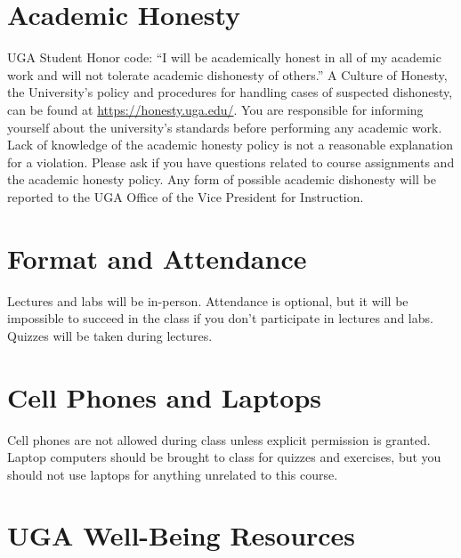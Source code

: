 \documentclass[12pt]{article}
\begin{document}
\newpage

\vspace{-2mm}
\section*{\normalsize Academic Honesty}
\vspace{-4mm}

UGA Student Honor code: ``I will be academically honest in all of my
academic work and will not tolerate academic dishonesty of others.'' A
Culture of Honesty, the University's policy and procedures for
handling cases of suspected dishonesty, can be found at
\url{https://honesty.uga.edu/}. You are responsible for 
informing yourself about the university's standards before performing
any academic work. Lack of knowledge of the academic honesty policy is
not a reasonable explanation for a violation. Please ask if you have
questions related to course assignments and the academic honesty
policy. Any form of possible academic dishonesty will be reported to
the UGA Office of the Vice President for Instruction.


\section*{\normalsize Format and Attendance}
\vspace{-4mm}
Lectures and labs will be in-person. Attendance is optional, but it
will be impossible to succeed in the class if you don't participate in
lectures and labs. Quizzes will be taken during lectures. 

\section*{\normalsize Cell Phones and Laptops}
\vspace{-4mm}
Cell phones are not allowed during class unless explicit permission is
granted. Laptop computers should be brought to class for quizzes and
exercises, but you should not use laptops for anything unrelated to
this course.


\section*{\normalsize UGA Well-Being Resources}
\vspace{-4mm}
\end{document}
